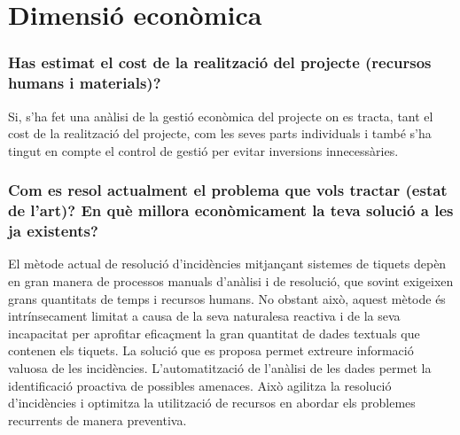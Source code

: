\section{Dimensió econòmica}

\subsubsection{Has estimat el cost de la realització del projecte (recursos humans i materials)?}
Si, s'ha fet una anàlisi de la gestió econòmica del projecte on es tracta, tant el cost de la realització del projecte, com les seves parts individuals i també s'ha tingut en compte el control de gestió per evitar inversions innecessàries.

\subsubsection{Com es resol actualment el problema que vols tractar (estat de l'art)? En què millora econòmicament la teva solució a les ja existents?}
El mètode actual de resolució d'incidències mitjançant sistemes de tiquets depèn en gran manera de processos manuals d'anàlisi i de resolució, que sovint exigeixen grans quantitats de temps i recursos humans. No obstant això, aquest mètode és intrínsecament limitat a causa de la seva naturalesa reactiva i de la seva incapacitat per aprofitar eficaçment la gran quantitat de dades textuals que contenen els tiquets. La solució que es proposa permet extreure informació valuosa de les incidències. L'automatització de l'anàlisi de les dades permet la identificació proactiva de possibles amenaces. Això agilitza la resolució d'incidències i optimitza la utilització de recursos en abordar els problemes recurrents de manera preventiva.
